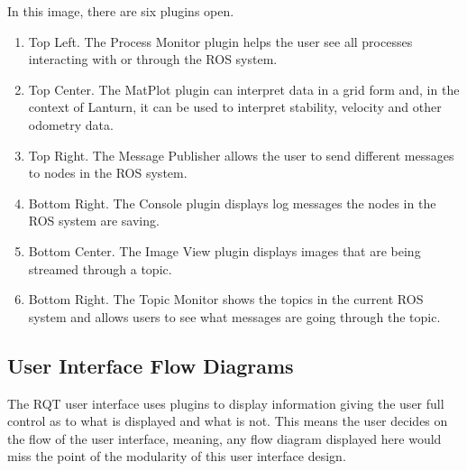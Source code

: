 In this image, there are six plugins open. 
\begin{enumerate}
    \item Top Left. The Process Monitor plugin helps the user see all processes interacting with or through the ROS system. 
    \item Top Center. The MatPlot plugin can interpret data in a grid form and, in the context of Lanturn, it can be used to interpret stability, velocity and other odometry data. 
    \item Top Right. The Message Publisher allows the user to send different messages to nodes in the ROS system. 
    \item Bottom Right. The Console plugin displays log messages the nodes in the ROS system are saving. 
    \item Bottom Center. The Image View plugin displays images that are being streamed through a topic. 
    \item Bottom Right. The Topic Monitor shows the topics in the current ROS system and allows users to see what messages are going through the topic.
\end{enumerate}

\subsection{User Interface Flow Diagrams}
\label{sec:flowdiagrams}

The RQT user interface uses plugins to display information giving the user full
control as to what is displayed and what is not. This means the user decides on
the flow of the user interface, meaning, any flow diagram displayed here would
miss the point of the modularity of this user interface design.
\par


